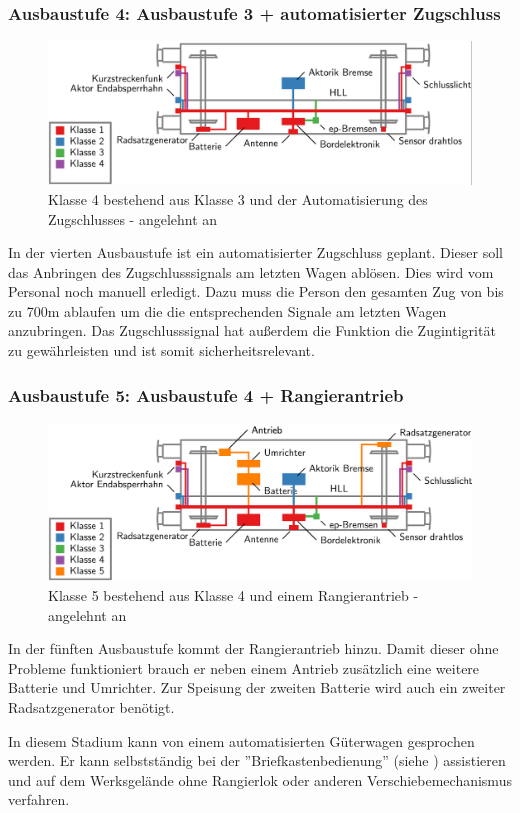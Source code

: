 \subsubsection{Ausbaustufe 4: Ausbaustufe 3 + automatisierter Zugschluss}
\begin{figure}[htbp] 
    \includegraphics[width=\textwidth]{Bilder/Ausbaustufen_4.PNG}
    \caption{Klasse 4 bestehend aus Klasse 3 und der Automatisierung des Zugschlusses - angelehnt an \cite{ETR_3}}
    \label{fig:Klasse4}
\end{figure} 
In der vierten Ausbaustufe ist ein automatisierter Zugschluss geplant. Dieser soll das Anbringen des Zugschlusssignals am letzten Wagen ablösen. Dies wird vom Personal noch manuell erledigt. Dazu muss die Person den gesamten Zug von bis zu 700m ablaufen um die die entsprechenden Signale am letzten Wagen anzubringen. Das Zugschlusssignal hat außerdem die Funktion die Zugintigrität zu gewährleisten und ist somit sicherheitsrelevant. 
\subsubsection{Ausbaustufe 5: Ausbaustufe 4 + Rangierantrieb} \label{sec:A5}
\begin{figure}[htbp] 
    \includegraphics[width=\textwidth]{Bilder/Ausbaustufen_5.PNG}
    \caption{Klasse 5 bestehend aus Klasse 4 und einem Rangierantrieb - angelehnt an \cite{ETR_3}}
    \label{fig:Klasse5}
\end{figure} 
In der fünften Ausbaustufe kommt der Rangierantrieb hinzu. Damit dieser ohne Probleme funktioniert brauch er neben einem Antrieb zusätzlich eine weitere Batterie und Umrichter. Zur Speisung der zweiten Batterie wird auch ein zweiter Radsatzgenerator benötigt.\par
In diesem Stadium kann von einem automatisierten Güterwagen gesprochen werden. Er kann selbstständig bei der ''Briefkastenbedienung'' (siehe \cite{GAK}) assistieren und auf dem Werksgelände ohne Rangierlok oder anderen Verschiebemechanismus verfahren.
